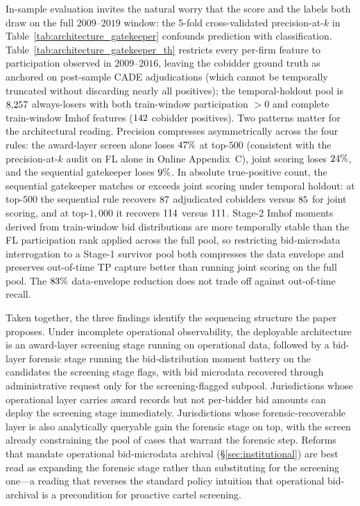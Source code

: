 In-sample evaluation invites the natural worry that the score
and the labels both draw on the full $2009$--$2019$ window: the
5-fold cross-validated precision-at-$k$ in
Table~\ref{tab:architecture_gatekeeper} confounds prediction
with classification. Table~\ref{tab:architecture_gatekeeper_th}
restricts every per-firm feature to participation observed in
$2009$--$2016$, leaving the cobidder ground truth as anchored on
post-sample CADE adjudications (which cannot be temporally
truncated without discarding nearly all positives); the
temporal-holdout pool is $8{,}257$ always-losers with
both train-window participation $>0$ and complete train-window
Imhof features ($142$ cobidder positives). Two
patterns matter for the architectural reading. Precision
compresses asymmetrically across the four rules: the award-layer
screen alone loses $47\%$ at top-$500$ (consistent
with the precision-at-$k$ audit on FL alone in Online
Appendix~C), joint scoring loses $24\%$, and the
sequential gatekeeper loses $9\%$. In absolute
true-positive count, the sequential gatekeeper matches or
exceeds joint scoring under temporal holdout: at top-$500$ the
sequential rule recovers $87$ adjudicated
cobidders versus $85$ for joint scoring,
and at top-$1{,}000$ it recovers $114$ versus
$111$. Stage-2 Imhof moments derived from
train-window bid distributions are more temporally stable than
the FL participation rank applied across the full pool, so
restricting bid-microdata interrogation to a Stage-1 survivor
pool both compresses the data envelope and preserves out-of-time
TP capture better than running joint scoring on the full pool.
The $83\%$ data-envelope reduction does
not trade off against out-of-time recall.



Taken together, the three findings identify the sequencing
structure the paper proposes. Under incomplete operational
observability, the deployable architecture is an award-layer
screening stage running on operational data, followed by a
bid-layer forensic stage running the bid-distribution moment
battery on the candidates the screening stage flags, with bid
microdata recovered through administrative request only for the
screening-flagged subpool. Jurisdictions whose operational layer
carries award records but not per-bidder bid amounts can deploy
the screening stage immediately. Jurisdictions whose
forensic-recoverable layer is also analytically queryable gain
the forensic stage on top, with the screen already constraining
the pool of cases that warrant the forensic step. Reforms that
mandate operational bid-microdata archival
(\S\ref{sec:institutional}) are best read as expanding the
forensic stage rather than substituting for the screening one---a
reading that reverses the standard policy intuition that
operational bid-archival is a precondition for proactive cartel
screening.
